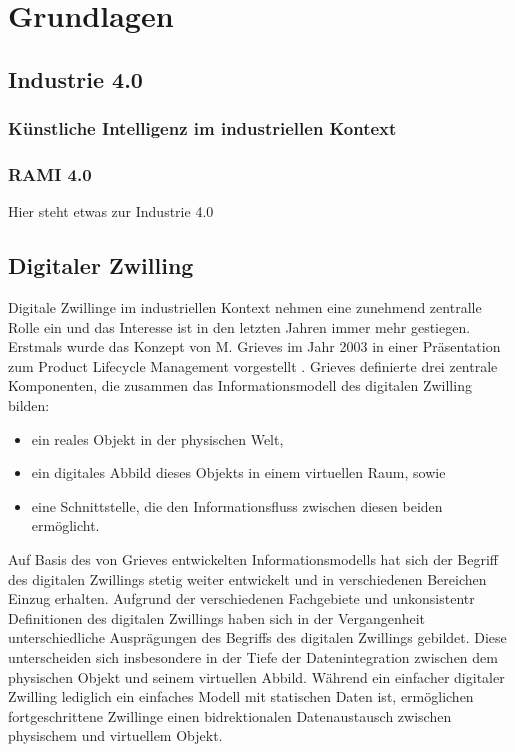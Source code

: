 \section{Grundlagen}
\subsection{Industrie 4.0}
\subsubsection{Künstliche Intelligenz im industriellen Kontext}
\subsubsection{RAMI 4.0}
Hier steht etwas zur Industrie 4.0


\newpage
\subsection{Digitaler Zwilling}
Digitale Zwillinge im industriellen Kontext nehmen eine zunehmend zentralle Rolle ein und das Interesse ist in den letzten Jahren immer mehr gestiegen.
Erstmals wurde das Konzept von M. Grieves im Jahr 2003 in einer Präsentation zum Product Lifecycle Management vorgestellt \cite{DTGrieves}. 
Grieves definierte drei zentrale Komponenten, die zusammen das Informationsmodell des digitalen Zwilling bilden:
\begin{itemize}
    \item ein reales Objekt in der physischen Welt,
    \item ein digitales Abbild dieses Objekts in einem virtuellen Raum, sowie
    \item eine Schnittstelle, die den Informationsfluss zwischen diesen beiden ermöglicht.
\end{itemize}

Auf Basis des von Grieves entwickelten Informationsmodells hat sich der Begriff des digitalen Zwillings stetig weiter entwickelt und in verschiedenen Bereichen Einzug erhalten. 
Aufgrund der verschiedenen Fachgebiete und unkonsistentr Definitionen des digitalen Zwillings haben sich in der Vergangenheit unterschiedliche Ausprägungen des Begriffs des digitalen Zwillings gebildet.
Diese unterscheiden sich insbesondere in der Tiefe der Datenintegration zwischen dem physischen Objekt und seinem virtuellen Abbild.
Während ein einfacher digitaler Zwilling lediglich ein einfaches Modell mit statischen Daten ist, ermöglichen fortgeschrittene Zwillinge einen bidrektionalen Datenaustausch zwischen physischem und virtuellem Objekt. 

